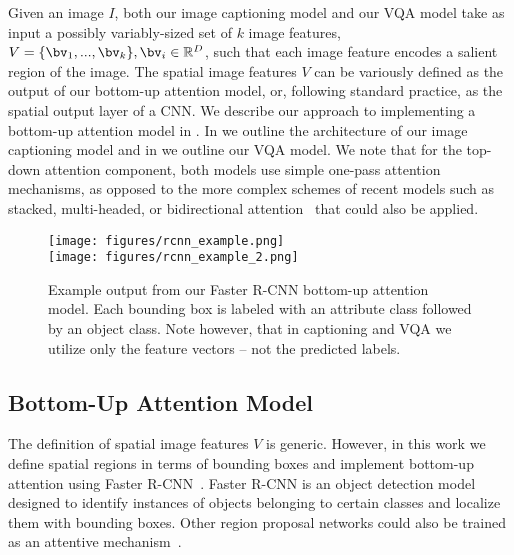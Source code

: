 \documentclass[10pt,twocolumn,letterpaper]{article}
\begin{document}
Given an image $I$, both our image captioning model and our VQA model take as input a possibly variably-sized set of $k$ image features, $V = \{\bv_1,...,\bv_k\}, \bv_i \in \mathbb{R}^D$, such that each image feature encodes a salient region of the image. The spatial image features $V$ can be variously defined as the output of our bottom-up attention model, or, following standard practice, as the spatial output layer of a CNN. We describe our approach to implementing a bottom-up attention model in . In  we outline the architecture of our image captioning model and in  we outline our VQA model. We note that for the top-down attention component, both models use simple one-pass attention mechanisms, as opposed to the more complex schemes of recent models such as stacked, multi-headed, or bidirectional attention~\cite{stacked,jabri2016revisiting,kazemi2017baseline,coatt} that could also be applied.


\begin{figure}[t]
	\begin{center}
		\texttt{[image: figures/rcnn\_example.png]}\\
\texttt{[image: figures/rcnn\_example\_2.png]}\\
\end{center}
	\caption{Example output from our Faster R-CNN bottom-up attention model. Each bounding box is labeled with an attribute class followed by an object class. Note however, that in captioning and VQA we utilize only the feature vectors -- not the predicted labels.}
	\label{fig:rcnn-demo}
\end{figure}


\subsection{Bottom-Up Attention Model}
\label{sec:rcnn}

The definition of spatial image features $V$ is generic. However, in this work we define spatial regions in terms of bounding boxes and implement bottom-up attention using Faster R-CNN~\cite{faster_rcnn}. Faster R-CNN is an object detection model designed to identify instances of objects belonging to certain classes and localize them with bounding boxes. Other region proposal networks could also be trained as an attentive mechanism~\cite{yolo2016,liu2015ssd}.
\end{document}

